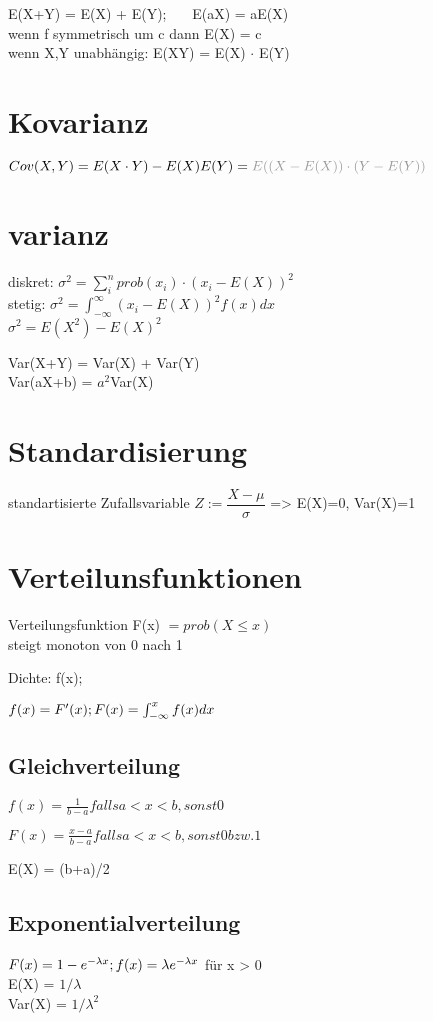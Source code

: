 E(X+Y) = E(X) + E(Y);~~~ E(aX) = aE(X) \\
wenn f symmetrisch um c dann E(X) = c\\
wenn X,Y unabhängig: E(XY) = E(X) $\cdot$ E(Y)

\section*{Kovarianz}
$Cov(X,Y) = E(X \cdot Y) -E(X)E(Y)= \gray{E((X-E(X))\cdot(Y-E(Y)) }$

\section*{varianz}
diskret: $ \sigma^2 = \sum_i^n prob(x_i)\cdot (x_i -E(X))^2$\\
stetig: $ \sigma^2 = \int_{-\infty}^{\infty} (x_i -E(X))^2 f(x) dx$ \\
$\sigma^2 = E(X^2) - E(X)^2$

Var(X+Y) = Var(X) + Var(Y) \\
Var(aX+b) = $a^2$Var(X)


\section*{Standardisierung}
standartisierte Zufallsvariable $Z:=\dfrac{X-\mu}{\sigma}$ => E(X)=0, Var(X)=1


\section*{Verteilunsfunktionen}
Verteilungsfunktion F(x) $= prob(X \leq x)$\\
steigt monoton von 0 nach 1

Dichte: f(x);

$f(x) = F'(x); \\
 F(x) = \int_{-\infty}^xf(x)dx$

\subsection*{Gleichverteilung}
$f(x) = \frac{1}{b-a} falls a < x < b, sonst 0$

$F(x)  = \frac{x-a}{b-a} falls a < x < b, sonst 0 bzw. 1$

E(X) = (b+a)/2

\subsection*{Exponentialverteilung}
$F(x) = 1 - e^{-\lambda x};  \\ f(x) = \lambda e^{-\lambda x}$ für x > 0 \\
E(X) = $1/\lambda$ \\
Var(X) = $1/\lambda^2$

